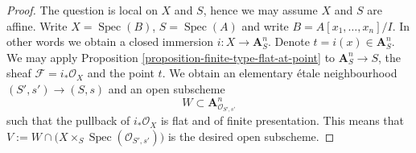 \documentclass[10pt,a4paper]{amsart}
\theoremstyle{plain}
\theoremstyle{definition}
\theoremstyle{remark}
\numberwithin{equation}{subsection}
\def\Spec{\mathop{\mathrm{Spec}}}
\begin{document}
\begin{proof}
The question is local on $X$ and $S$, hence we may assume $X$ and $S$
are affine. Write $X = \Spec(B)$, $S = \Spec(A)$ and write
$B = A[x_1, \ldots, x_n]/I$. In other words we obtain a closed immersion
$i : X \to \mathbf{A}^n_S$. Denote $t = i(x) \in \mathbf{A}^n_S$.
We may apply
Proposition \ref{proposition-finite-type-flat-at-point}
to $\mathbf{A}^n_S \to S$, the sheaf $\mathcal{F} = i_*\mathcal{O}_X$
and the point $t$. We obtain an elementary
\'etale neighbourhood $(S', s') \to (S, s)$ and an open subscheme
$$
W \subset \mathbf{A}^n_{\mathcal{O}_{S', s'}}
$$
such that the pullback of $i_*\mathcal{O}_X$ is flat and of finite
presentation. This means that
$V := W \cap \big(X \times_S \Spec(\mathcal{O}_{S', s'})\big)$
is the desired open subscheme.
\end{proof}
\end{document}
